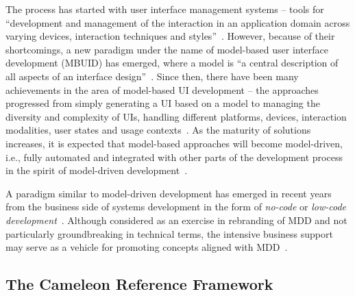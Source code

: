 The process has started with user interface management systems – tools for \enquote{development and management of the interaction in an application domain across varying devices, interaction techniques and styles}~\cite{Betts1987}.
However, because of their shortcomings, a new paradigm under the name of model-based user interface development (MBUID) has emerged, where a model is \enquote{a central description of all aspects of an interface design}~\cite{Puerta1994}.
Since then, there have been many achievements in the area of model-based UI development – the approaches progressed from simply generating a UI based on a model to managing the diversity and complexity of UIs, handling different platforms, devices, interaction modalities, user states and usage contexts~\cite{Meixner2011}.
As the maturity of solutions increases, it is expected that model-based approaches will become model-driven, i.e., fully automated and integrated with other parts of the development process in the spirit of model-driven development~\cite{Ruiz2018}.

A paradigm similar to model-driven development has emerged in recent years from the business side of systems development in the form of \emph{no-code} or \emph{low-code development}~\cite{Rymer2019}.
Although considered as an exercise in rebranding of MDD and not particularly groundbreaking in technical terms, the intensive business support may serve as a vehicle for promoting concepts aligned with MDD~\cite{Bock2021}.

\subsection{The Cameleon Reference Framework}\label{subsec:the-cameleon-reference-framework}

